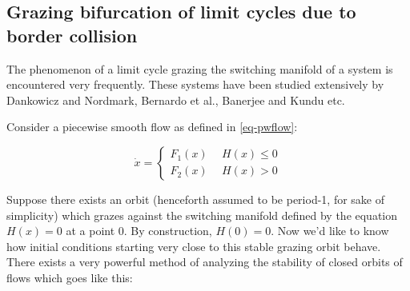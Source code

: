 \documentclass{book}
\renewcommand{\(}{\begin{columns}}
\renewcommand{\)}{\end{columns}}
\newcommand{\<}[1]{\begin{column}{#1}}
\renewcommand{\>}{\end{column}}
\begin{document}
\subsection{Grazing bifurcation of limit cycles due to border collision}
The phenomenon of a limit cycle grazing the switching manifold of a system is encountered 
very frequently.  These systems have been studied extensively by Dankowicz and Nordmark\cite{dankowicz-nordmark-zdm}, Bernardo et al.\cite{bernardo-grazing-prl}, Banerjee and Kundu\cite{banerjee-kundu-soft} etc.


Consider a piecewise smooth flow as defined in \eqref{eq-pwflow}:

\begin{equation}
\dot{x}=
\begin{cases}
F_1(x)&~~H(x)\le 0\\
F_2(x)&~~H(x)> 0
\end{cases}
\end{equation}

Suppose there exists an orbit (henceforth assumed to be period-1, for sake of 
simplicity)  which grazes against the switching manifold defined by the 
equation $H(x)=0$ at a point $0$.  By construction, $H(0)=0$.  Now we'd like 
to know how initial conditions starting very close to this stable grazing 
orbit behave.  There exists a very powerful method of analyzing the stability 
of closed orbits of flows which goes like this:
\end{document}
